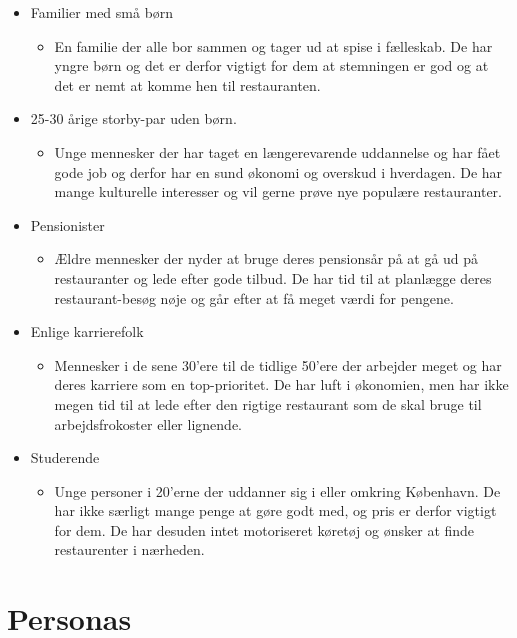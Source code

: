 \documentclass[a4paper, 12pt]{article}
\begin{document}
\begin{itemize}
  \item Familier med små børn
  \begin{itemize}
    \item En familie der alle bor sammen og tager ud at spise i fælleskab. De har yngre børn og det er derfor vigtigt for dem at stemningen er god og at det er nemt at komme hen til restauranten.
  \end{itemize}
  \item 25-30 årige storby-par uden børn.
  \begin{itemize}
    \item Unge mennesker der har taget en længerevarende uddannelse og har fået gode job og derfor har en sund økonomi og overskud i hverdagen. De har mange kulturelle interesser og vil gerne prøve nye populære restauranter.
  \end{itemize}
  \item Pensionister
 \begin{itemize}
    \item Ældre mennesker der nyder at bruge deres pensionsår på at gå ud på restauranter og lede efter gode tilbud. De har tid til at planlægge deres restaurant-besøg nøje og går efter at få meget værdi for pengene.
  \end{itemize}
  \item Enlige karrierefolk
 \begin{itemize}
    \item Mennesker i de sene 30'ere til de tidlige 50'ere der arbejder meget og har deres karriere som en top-prioritet. De har luft i økonomien, men har ikke megen tid til at lede efter den rigtige restaurant som de skal bruge til arbejdsfrokoster eller lignende.
  \end{itemize}
  \item Studerende
 \begin{itemize}
    \item Unge personer i 20'erne der uddanner sig i eller omkring
      København. De har ikke særligt mange penge at gøre godt med, og
      pris er derfor vigtigt for dem. De har desuden intet motoriseret
      køretøj og ønsker at finde restaurenter i nærheden.
  \end{itemize}
\end{itemize}

\section{Personas}
\label{sec:Personas}
\end{document}
